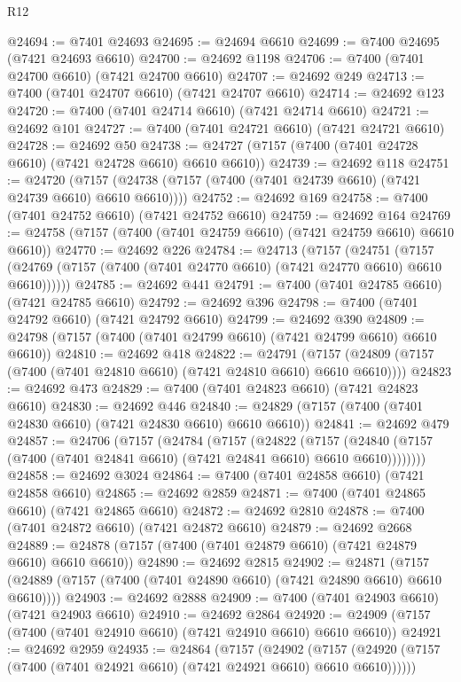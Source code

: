 \begin{lexlean}{R12}
\begin{coremodule}
@24694 := @7401 @24693
@24695 := @24694 @6610
@24699 := @7400 @24695 (@7421 @24693 @6610)
@24700 := @24692 @1198
@24706 := @7400 (@7401 @24700 @6610) (@7421 @24700 @6610)
@24707 := @24692 @249
@24713 := @7400 (@7401 @24707 @6610) (@7421 @24707 @6610)
@24714 := @24692 @123
@24720 := @7400 (@7401 @24714 @6610) (@7421 @24714 @6610)
@24721 := @24692 @101
@24727 := @7400 (@7401 @24721 @6610) (@7421 @24721 @6610)
@24728 := @24692 @50
@24738 := @24727 (@7157 (@7400 (@7401 @24728 @6610) (@7421 @24728 @6610) @6610 @6610))
@24739 := @24692 @118
@24751 := @24720
    (@7157 (@24738 (@7157 (@7400 (@7401 @24739 @6610) (@7421 @24739 @6610) @6610 @6610))))
@24752 := @24692 @169
@24758 := @7400 (@7401 @24752 @6610) (@7421 @24752 @6610)
@24759 := @24692 @164
@24769 := @24758 (@7157 (@7400 (@7401 @24759 @6610) (@7421 @24759 @6610) @6610 @6610))
@24770 := @24692 @226
@24784 := @24713
    (@7157
      (@24751
        (@7157 (@24769 (@7157 (@7400 (@7401 @24770 @6610) (@7421 @24770 @6610) @6610 @6610))))))
@24785 := @24692 @441
@24791 := @7400 (@7401 @24785 @6610) (@7421 @24785 @6610)
@24792 := @24692 @396
@24798 := @7400 (@7401 @24792 @6610) (@7421 @24792 @6610)
@24799 := @24692 @390
@24809 := @24798 (@7157 (@7400 (@7401 @24799 @6610) (@7421 @24799 @6610) @6610 @6610))
@24810 := @24692 @418
@24822 := @24791
    (@7157 (@24809 (@7157 (@7400 (@7401 @24810 @6610) (@7421 @24810 @6610) @6610 @6610))))
@24823 := @24692 @473
@24829 := @7400 (@7401 @24823 @6610) (@7421 @24823 @6610)
@24830 := @24692 @446
@24840 := @24829 (@7157 (@7400 (@7401 @24830 @6610) (@7421 @24830 @6610) @6610 @6610))
@24841 := @24692 @479
@24857 := @24706
    (@7157
      (@24784
        (@7157
          (@24822
            (@7157
              (@24840 (@7157 (@7400 (@7401 @24841 @6610) (@7421 @24841 @6610) @6610 @6610))))))))
@24858 := @24692 @3024
@24864 := @7400 (@7401 @24858 @6610) (@7421 @24858 @6610)
@24865 := @24692 @2859
@24871 := @7400 (@7401 @24865 @6610) (@7421 @24865 @6610)
@24872 := @24692 @2810
@24878 := @7400 (@7401 @24872 @6610) (@7421 @24872 @6610)
@24879 := @24692 @2668
@24889 := @24878 (@7157 (@7400 (@7401 @24879 @6610) (@7421 @24879 @6610) @6610 @6610))
@24890 := @24692 @2815
@24902 := @24871
    (@7157 (@24889 (@7157 (@7400 (@7401 @24890 @6610) (@7421 @24890 @6610) @6610 @6610))))
@24903 := @24692 @2888
@24909 := @7400 (@7401 @24903 @6610) (@7421 @24903 @6610)
@24910 := @24692 @2864
@24920 := @24909 (@7157 (@7400 (@7401 @24910 @6610) (@7421 @24910 @6610) @6610 @6610))
@24921 := @24692 @2959
@24935 := @24864
    (@7157
      (@24902
        (@7157 (@24920 (@7157 (@7400 (@7401 @24921 @6610) (@7421 @24921 @6610) @6610 @6610))))))

\end{coremodule}
\end{lexlean}
